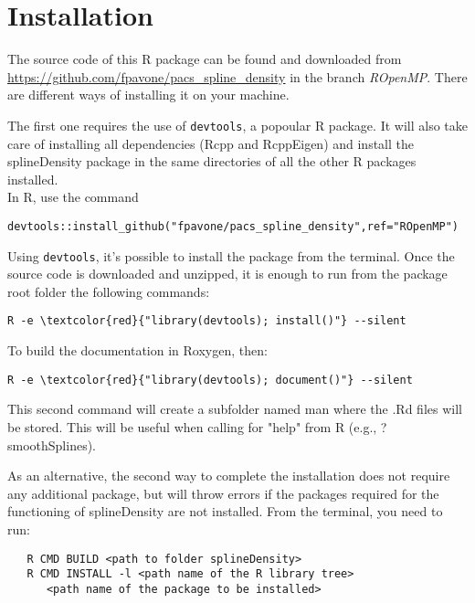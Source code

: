 \chapter{Installation}
\label{installation}

\noindent 
The source code of this R package can be found and downloaded from \url{https://github.com/fpavone/pacs_spline_density} in the branch \textit{ROpenMP}. 
There are different ways of installing it on your machine.

The first one requires the use of \verb|devtools|, a popoular R package. It will also take care of installing all dependencies (Rcpp and RcppEigen) and install the splineDensity package in the same directories of all the other R packages installed.  \\
In R, use the command 
\begin{Verbatim}[commandchars=\\\{\}]
devtools::install_github("fpavone/pacs_spline_density",ref="ROpenMP")
\end{Verbatim}
Using \verb|devtools|, it's possible to install the package from the terminal.
Once the source code is downloaded and unzipped, it is enough to run from the package root folder the following commands:
\begin{Verbatim}[commandchars=\\\{\}]
   R -e \textcolor{red}{"library(devtools); install()"} --silent
\end{Verbatim}
To build the documentation in Roxygen, then:
\begin{Verbatim}[commandchars=\\\{\}]
   R -e \textcolor{red}{"library(devtools); document()"} --silent
\end{Verbatim}

This second command will create a subfolder named man where the .Rd files will be stored. This will be useful when calling for "help" from R (e.g., ?smoothSplines).

As an alternative, the second way to complete the installation does not require any additional package, but will throw errors if the packages required for the functioning of splineDensity are not installed.
From the terminal, you need to run:
\begin{verbatim}
   R CMD BUILD <path to folder splineDensity>
   R CMD INSTALL -l <path name of the R library tree> 
      <path name of the package to be installed>
\end{verbatim}

